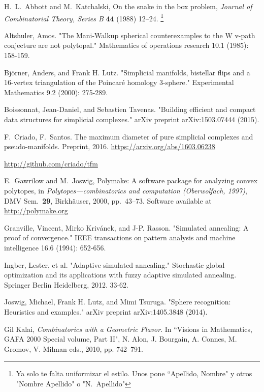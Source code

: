 \documentclass[12pt,a4paper]{article}
\newcommand{\copa}[1]{\footnote{\color{blue} #1}}
\theoremstyle{plain}
\theoremstyle{definition}
\begin{document}
\begin{thebibliography}{99}
H.~L.~Abbott and M.~Katchalski, On the snake in the box problem, \emph{Journal of Combinatorial Theory, Series B} {\bf 44} (1988) 12--24.
\copa{Ya solo te falta uniformizar el estilo. Unos pone ``Apellido, Nombre" y otros "Nombre Apellido" o "N.~Apellido"}

  Altshuler, Amos. "The Mani-Walkup spherical counterexamples to the W v-path conjecture are not polytopal." Mathematics of operations research 10.1 (1985): 158-159.

  Björner, Anders, and Frank H. Lutz. "Simplicial manifolds, bistellar flips and a 16-vertex triangulation of the Poincaré homology 3-sphere." Experimental Mathematics 9.2 (2000): 275-289.

  Boissonnat, Jean-Daniel, and Sebastien Tavenas. "Building efficient and compact data structures for simplicial complexes." arXiv preprint arXiv:1503.07444 (2015).

  F.~Criado, F.~Santos.
  The maximum diameter of pure simplicial complexes and pseudo-manifolds.
  Preprint, 2016.
  \url{https://arxiv.org/abs/1603.06238}

  \url{http://github.com/criado/tfm}

E.~Gawrilow and M.~Joswig,
Polymake: A software package for analyzing convex polytopes,
in \emph{Polytopes---combinatorics and computation (Oberwolfach, 1997)},
DMV Sem.~\textbf{29}, Birkh\"auser, 2000, pp.~43--73.
Software available at \url{http://polymake.org}

  Granville, Vincent, Mirko Krivánek, and J-P. Rasson. "Simulated annealing: A proof of convergence." IEEE transactions on pattern analysis and machine intelligence 16.6 (1994): 652-656.

  Ingber, Lester, et al. "Adaptive simulated annealing." Stochastic global optimization and its applications with fuzzy adaptive simulated annealing. Springer Berlin Heidelberg, 2012. 33-62.

  Joswig, Michael, Frank H. Lutz, and Mimi Tsuruga. "Sphere recognition: Heuristics and examples." arXiv preprint arXiv:1405.3848 (2014).

Gil Kalai, \emph{Combinatorics with a Geometric Flavor}.
In ``Visions in Mathematics, GAFA 2000 Special volume, Part II",
N. Alon, J. Bourgain, A. Connes, M. Gromov, V. Milman eds., 2010, pp. 742--791.


\end{thebibliography}
\end{document}
